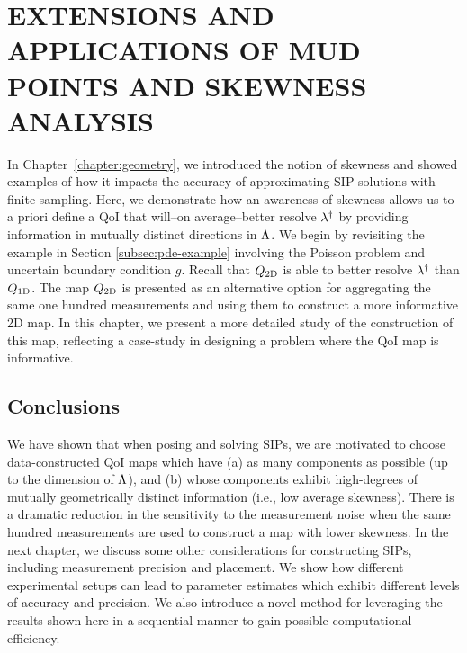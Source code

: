 \chapter{\uppercase{Extensions and Applications of MUD Points and Skewness Analysis} \label{chapter:vector-valued}}

In Chapter~\ref{chapter:geometry}, we introduced the notion of skewness and showed examples of how it impacts the accuracy of approximating SIP solutions with finite sampling.
Here, we demonstrate how an awareness of skewness allows us to a priori define a QoI that will\---on average\---better resolve $\lambda^\dagger$ by providing information in mutually distinct directions in ${\Lambda}$.
We begin by revisiting the example in Section \ref{subsec:pde-example} involving the Poisson problem and uncertain boundary condition $g$.
Recall that $Q_\text{2D}$ is able to better resolve $\lambda^\dagger$ than $Q_\text{1D}$.
The map $Q_\text{2D}$ is presented as an alternative option for aggregating the same one hundred measurements and using them to construct a more informative 2D map.
In this chapter, we present a more detailed study of the construction of this map, reflecting a case-study in designing a problem where the QoI map is informative.


\FloatBarrier


\FloatBarrier





\FloatBarrier


\section{Conclusions}

We have shown that when posing and solving SIPs, we are motivated to choose data-constructed QoI maps which have (a) as many components as possible (up to the dimension of ${\Lambda}$), and (b) whose components exhibit high-degrees of mutually geometrically distinct information (i.e., low average skewness).
There is a dramatic reduction in the sensitivity to the measurement noise when the same hundred measurements are used to construct a map with lower skewness.
In the next chapter, we discuss some other considerations for constructing SIPs, including measurement precision and placement.
We show how different experimental setups can lead to parameter estimates which exhibit different levels of accuracy and precision.
We also introduce a novel method for leveraging the results shown here in a sequential manner to gain possible computational efficiency.
